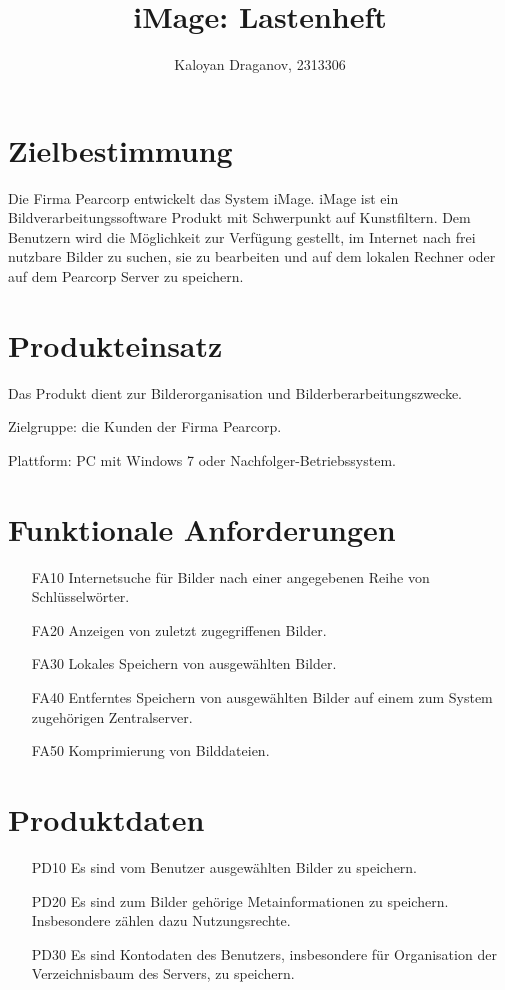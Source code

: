 \documentclass[parskip=full]{scrartcl}
\title{iMage: Lastenheft}
\author{Kaloyan Draganov, 2313306}
\begin{document}
\maketitle

\section{Zielbestimmung}
Die Firma Pearcorp entwickelt das System iMage. iMage ist ein Bildverarbeitungssoftware Produkt mit Schwerpunkt auf \gls{Kunstfiltern}. Dem \gls{Benutzern} wird die Möglichkeit zur Verfügung gestellt, im Internet nach frei nutzbare Bilder zu suchen, sie zu bearbeiten und auf dem lokalen \gls{Rechner} oder auf dem Pearcorp \gls{Server} zu speichern.

\section{Produkteinsatz}
Das Produkt dient zur Bilderorganisation und Bilderberarbeitungszwecke.

Zielgruppe: die Kunden der Firma Pearcorp.

Plattform: PC mit Windows 7 oder Nachfolger-Betriebssystem.

\section{Funktionale Anforderungen}
\begin{itemize}[nosep]
\item[FA10] Internetsuche für Bilder nach einer angegebenen Reihe von Schlüsselwörter.
\item[FA20] Anzeigen von zuletzt zugegriffenen Bilder.
\item[FA30] Lokales Speichern von ausgewählten Bilder.
\item[FA40] Entferntes Speichern von ausgewählten Bilder auf einem zum System zugehörigen Zentralserver.
\item[FA50] Komprimierung von Bilddateien.
\end{itemize}

\section{Produktdaten}
\begin{itemize}[nosep]
\item[PD10] Es sind vom Benutzer ausgewählten Bilder zu speichern.
\item[PD20] Es sind zum Bilder gehörige \gls{Metainformationen} zu speichern. Insbesondere zählen dazu Nutzungsrechte.
\item[PD30] Es sind Kontodaten des Benutzers, insbesondere für Organisation der Verzeichnisbaum des Servers, zu speichern.
\end{itemize}
\end{document}
